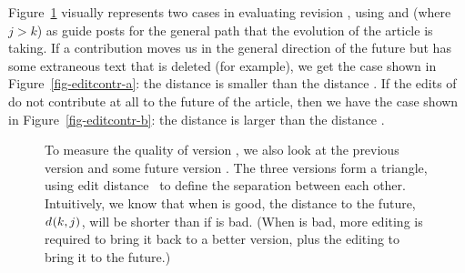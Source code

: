 Figure~\ref{fig-editcontr} visually represents two cases in
evaluating revision , using 
and  (where $j > k$) as guide posts for the general
path that the evolution of the article is taking.
If a contribution moves us in the general direction of
the future but has some extraneous text that is deleted (for example),
we get the case shown in Figure~\ref{fig-editcontr-a}:
the distance  is smaller than the distance .
If the edits of  do not contribute at all to the
future of the article, then we have the case shown in
Figure~\ref{fig-editcontr-b}:
the distance  is larger than the distance .

\begin{figure}[t]
\centering
{}
\hspace{1ex}
\caption[Edit distance triangles allow us to compute quality]{
        To measure the quality of version , we also
	look at the previous version  and some future
	version .
	The three versions form a triangle, using
	edit distance~\cite{Damerau1964,Levenshtein1966} to
        define the separation between each other.
	Intuitively, we know that when  is good,
	the distance to the future, $d_{}(k, j)$,
	will be shorter than if  is bad.
	(When  is bad, more editing is required to
	bring it back to a better version, plus the editing
	to bring it to the future.)
}
\label{fig-editcontr}
\end{figure}

